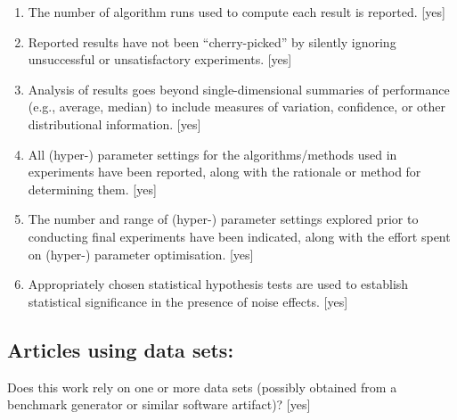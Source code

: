 \documentclass[manuscript, screen, review]{jair}
\begin{document}
\begin{enumerate}
    The evaluation metrics used in experiments are clearly explained and their choice is explicitly motivated.
    [yes]
    \item
    The number of algorithm runs used to compute each result is reported.
    [yes]
    \item
    Reported results have not been ``cherry-picked'' by silently ignoring unsuccessful or unsatisfactory experiments.
    [yes]
    \item
    Analysis of results goes beyond single-dimensional summaries of performance (e.g., average, median) to include measures of variation, confidence, or other distributional information.
    [yes]
    \item
    All (hyper-) parameter settings for
    the algorithms/methods used in experiments have been reported, along with the rationale or method for determining them.
    [yes]
    \item
    The number and range of (hyper-) parameter settings explored prior to conducting final experiments have been indicated, along with the effort spent on (hyper-) parameter optimisation.
    [yes]
    \item
    Appropriately chosen statistical hypothesis tests are used to establish statistical significance
    in the presence of noise effects.
    [yes]
\end{enumerate}

\subsection*{Articles using data sets:}
Does this work rely on one or more data sets (possibly obtained from a benchmark generator or similar software artifact)?
[yes]
\end{document}
